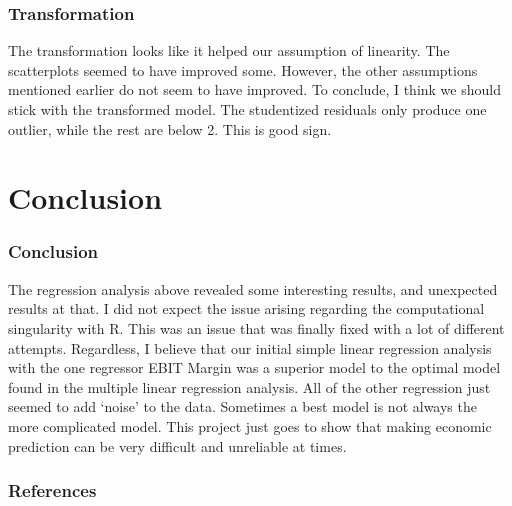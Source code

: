 \documentclass[12pt]{beamer}
\begin{document}
\begin{frame}
\frametitle{Transformation}
The transformation looks like it helped our assumption of linearity. The scatterplots seemed to have improved some. However, the other assumptions mentioned earlier do not seem to have improved. To conclude, I think we should stick with the transformed model. The studentized residuals only produce one outlier, while the rest are below 2. This is good sign.
\end{frame}

\section{Conclusion}
\begin{frame}
\frametitle{Conclusion}
The regression analysis above revealed some interesting results, and unexpected results at that. I did not expect the issue arising regarding the computational singularity with R. This was an issue that was finally fixed with a lot of different attempts. Regardless, I believe that our initial simple linear regression analysis with the one regressor EBIT Margin was a superior model to the optimal model found in the multiple linear regression analysis. All of the other regression just seemed to add `noise' to the data. Sometimes a best model is not always the more complicated model. This project just goes to show that making economic prediction can be very difficult and unreliable at times.
\end{frame}

\begin{frame}
\frametitle{References}


\end{frame}
\end{document}
